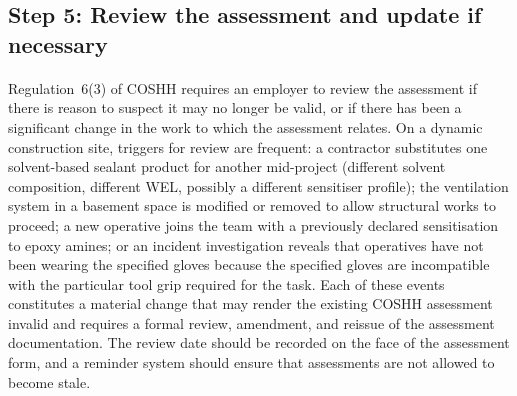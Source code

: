 \subsection{Step 5: Review the assessment and update if necessary}

\paragraph{}
Regulation~6(3) of COSHH requires an employer to review the assessment if there is reason to suspect it may no longer be valid, or if there has been a significant change in the work to which the assessment relates. On a dynamic construction site, triggers for review are frequent: a contractor substitutes one solvent-based sealant product for another mid-project (different solvent composition, different WEL, possibly a different sensitiser profile); the ventilation system in a basement space is modified or removed to allow structural works to proceed; a new operative joins the team with a previously declared sensitisation to epoxy amines; or an incident investigation reveals that operatives have not been wearing the specified gloves because the specified gloves are incompatible with the particular tool grip required for the task. Each of these events constitutes a material change that may render the existing COSHH assessment invalid and requires a formal review, amendment, and reissue of the assessment documentation. The review date should be recorded on the face of the assessment form, and a reminder system should ensure that assessments are not allowed to become stale.

